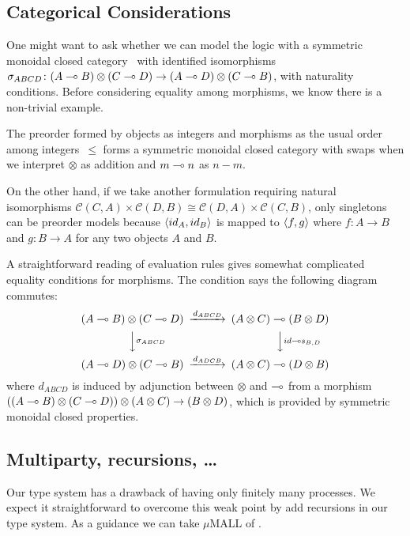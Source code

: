 \subsection{Categorical Considerations}
One might want to ask whether we can model the logic with
a symmetric monoidal closed category~\citep{blute2004category}
  with identified isomorphisms
$\sigma_{ABCD}\colon (A\multimap B)\otimes (C\multimap D)\rightarrow (A\multimap D) \otimes
 (C\multimap B)$, with naturality conditions.
 Before considering equality among morphisms,
 we know there is a non-trivial example.
  \begin{example}
   \label{smcc}
   The preorder formed by objects as integers and morphisms as the usual
   order among integers~$\le$
   forms a symmetric monoidal closed category with swaps
   when we interpret $\otimes$ as addition and
   $m \multimap n$ as $n-m$.
  \end{example}
  On the other hand,
  if we take another formulation requiring natural isomorphisms
  $\mathcal C(C,A)\times\mathcal C(D,B) \cong \mathcal C(D,A)\times
  \mathcal C{(C,B)}$,
  only singletons can be preorder models because $\langle{id_A,id_B}\rangle$ is
  mapped to $\langle{f,g}\rangle$ where $f\colon A\rightarrow B$ and $g\colon
  B\rightarrow A$ for any two objects $A$ and $B$.

A straightforward reading of evaluation rules gives somewhat complicated
equality conditions for morphisms.
The condition says the following diagram commutes:
\[
   \begin{CD}
    (A\limp B)\otimes (C\limp D) @>{d_{ABCD}}>> (A\otimes C)\limp(B\otimes D)\\
    @VV{\sigma_{ABCD}}V @VV{id\limp s_{B,D}}V\\
    (A\limp D)\otimes (C\limp B) @>{d_{ADCB}}>> (A\otimes C)\limp (D\otimes B)
   \end{CD}
\]
where $d_{ABCD}$ is induced by adjunction between $\otimes$ and $\multimap$
 from a morphism
 $((A\multimap B)\otimes (C\multimap D))\otimes (A\otimes C)\rightarrow
 (B\otimes D)$, which is provided by symmetric monoidal closed
 properties.

\subsection{Multiparty, recursions, \ldots}
Our type system has a drawback of having only finitely many processes.
We expect it straightforward to overcome this weak point by
add recursions in our type system.
As a guidance we can take $\mu$MALL of \citet{mumall}.

